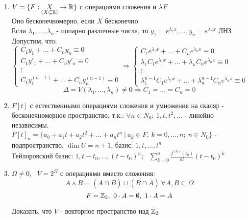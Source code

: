\begin{enumerate}
\begin{exercise}
    \end{exercise}
    \item $V = \{F:\underset{(X\subseteq \mathbb{R})}{X} \to \mathbb{R}\}$ с операциями сложения и $\lambda F$\\
    Оно бесконечномерно, если $X$ бесконечно.\\
    Если $\lambda_1, ..., \lambda_n$ - попарно различные числа, то $y_1 = e^{\lambda_1x},..., y_n = e^{\lambda_nx}$ ЛНЗ\\
    Допустим, что:
    $$\begin{cases}
      C_1y_1 + ... + C_ny_n \equiv 0\\
      C_1y'_1 + ... + C_ny'_n \equiv 0\\
      \vdots\\
      C_1y_1^{(n-1)} + ... + C_ny_n^{(n-1)} \equiv 0
    \end{cases} \Longrightarrow 
    \begin{cases}
      C_1e^{\lambda_1x} + ... + C_ne^{\lambda_nx} \equiv 0\\
      \lambda_1C_1e^{\lambda_1x} + ... + \lambda_nC_ne^{\lambda_nx} \equiv 0\\
      \vdots\\
      \lambda_1^{n-1} C_1e^{\lambda_1x} + ... + \lambda_n^{n-1} C_ne^{\lambda_nx} \equiv 0
    \end{cases}$$
    $$\Delta = V(\lambda_1,...,\lambda_n) \neq 0 \Longrightarrow C_1 = ... = C_n = 0$$
    \item $F[t]$ с естественными операциями сложения и умножения на скаляр - бесконечномерное пространство, т.к.: $\forall n \in N_0: \ 1, t, t^2,...$ - линейно независимы.\\
    $F[t]_n = \{a_0+a_1t+a_2t^2+...+a_nt^n \ | \ a_k\in F, \ k=0,...,n; \ n \in N_0\} $ - подпространство, $\dim U = n+1$, базис: $1,t,...,t^n$\\
    Тейлоровский базис: $1, t-t_0,...,(t-t_0)^n$; \ $\sum \limits_{k=0}^n\frac{f^{(k)}(t_0)}{k!}(t-t_0)^k$ 
    \item $\varOmega \neq 0$, \ $V = 2^\varOmega $ с операциями вместо сложения:
    $$A\vartriangle B = (A\cap \overline{B}) \cup (B\cap \overline{A}) \ \forall A,B \subseteq \varOmega$$
    $$F = \mathbb{Z}_2,  \ 0\cdot A = \emptyset , \ 1 \cdot A = A$$
    \begin{exercise}
      Доказать, что $V$ - векторное пространство над $\mathbb{Z}_2$
    \end{exercise}   
  \end{enumerate}
  
